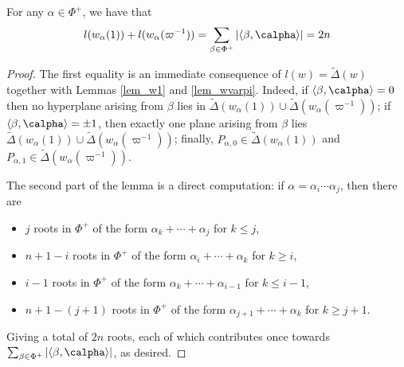     \begin{cor}\label{cor_lengthsum}
        For any $\alpha\in\Phi^+$, we have that 
        $$l(w_\alpha(1))+l(w_\alpha(\varpi^{-1}))=\sum_{\beta\in\Phi^+}|\langle\beta,\calpha\rangle|=2n$$
    \end{cor}
    \begin{proof}
        The first equality is an immediate consequence of $l(w)=\widetilde{\Delta}(w)$ together with Lemmas \ref{lem_w1} and \ref{lem_wvarpi}. Indeed, if $\langle\beta,\calpha\rangle=0$ then no hyperplane arising from $\beta$ lies in $\widetilde{\Delta}(w_\alpha(1))\cup\widetilde{\Delta}(w_\alpha(\varpi^{-1}))$; if $\langle\beta,\calpha\rangle=\pm1$, then exactly one plane arising from $\beta$ lies $\widetilde{\Delta}(w_\alpha(1))\cup\widetilde{\Delta}(w_\alpha(\varpi^{-1}))$; finally, $P_{\alpha,0}\in \widetilde{\Delta}(w_\alpha(1))$ and $P_{\alpha,1}\in \widetilde{\Delta}(w_\alpha(\varpi^{-1}))$.

        The second part of the lemma is a direct computation: if $\alpha=\alpha_i\cdots\alpha_j$, then there are 
        \begin{itemize}
            \item $j$ roots in $\Phi^+$ of the form $\alpha_k+\cdots+\alpha_j$ for $k\leq j$,
            \item $n+1-i$ roots in $\Phi^+$ of the form $\alpha_i+\cdots+\alpha_k$ for $k\geq i$,
            \item $i-1$ roots in $\Phi^+$ of the form $\alpha_k+\cdots+\alpha_{i-1}$ for $k\leq i-1$,
            \item $n+1-(j+1)$ roots in $\Phi^+$ of the form $\alpha_{j+1}+\cdots+\alpha_k$ for $k\geq j+1$.
        \end{itemize}
        Giving a total of $2n$ roots, each of which contributes once towards $\sum_{\beta\in\Phi^+}|\langle\beta,\calpha\rangle|$, as desired.
    \end{proof}

